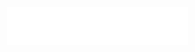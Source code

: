 \vspace{3cm}

\includegraphics[width=200px, right]{Figures/Logos/aulogo_uk_var2_white.eps}




\cleardoublepage
\afterpage{\aftergroup\restoregeometry}















